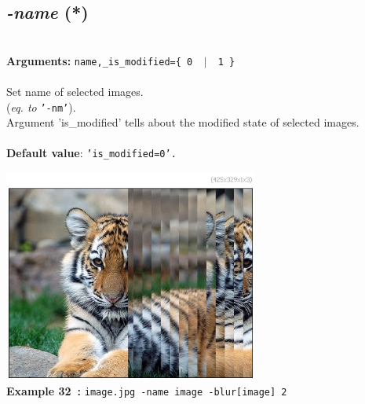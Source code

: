 \documentclass[a4paper,11pt,twoside]{book}
\begin{document}
\subsection{\emph{-name} (*)}\vspace*{-0.5em}
~\\\textbf{Arguments: } 
{\small \texttt{name,\_is\_modified=\{ 0 ~$|$~ 1 \}}}\\~\\
Set name of selected images.
~\\(\emph{eq. to} {\small \texttt{'-nm'}}).
~\\Argument 'is\_modified' tells about the modified state of selected images.
~\\~\\\textbf{Default value}: {\small \texttt{'is\_modified=0'.}}
\begin{center}\includegraphics[keepaspectratio=true,height=7cm,width=\textwidth]{img/gmic_def32.jpg}\\
{\footnotesize \textbf{Example 32~:} \texttt{image.jpg -name image -blur[image] 2}}
\end{center}
\end{document}
